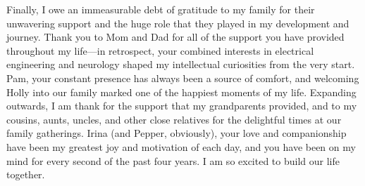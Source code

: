 Finally, I owe an immeasurable debt of gratitude to my family for their unwavering support and the huge role that they played in my development and journey. Thank you to Mom and Dad for all of the support you have provided throughout my life—in retrospect, your combined interests in electrical engineering and neurology shaped my intellectual curiosities from the very start. Pam, your constant presence has always been a source of comfort, and welcoming Holly into our family marked one of the happiest moments of my life. Expanding outwards, I am thank for the support that my grandparents provided, and to my cousins, aunts, uncles, and other close relatives for the delightful times at our family gatherings. Irina (and Pepper, obviously), your love and companionship have been my greatest joy and motivation of each day, and you have been on my mind for every second of the past four years. I am so excited to build our life together.
